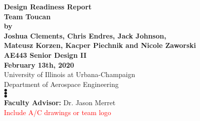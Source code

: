 \documentclass[conf]{new-aiaa}
\begin{document}
\begin{titlepage}
    \begin{center}
        \vspace*{1cm}
        {\LARGE \textbf{Design Readiness Report} \\
        \vspace{0.5cm}
        \textbf{Team Toucan}} \\
        \vspace{0.5cm}
        {\normalsize
        \textbf{by} \\
        \vspace{0.5cm}
        \textbf{Joshua Clements, Chris Endres, Jack Johnson,\\ Mateusz Korzen, Kacper Piechnik and Nicole Zaworski} \\
        \vspace{0.5cm}
        {\large\textbf{AE443 Senior Design II}}\\
        \vspace{0.5cm}
        \textbf{February 13th, 2020}} \\
        \vspace{2.5cm}
        {\large University of Illinois at Urbana-Champaign \\ Department of Aerospace Engineering} \\ 
        {\Large
        $\bullet$\\
        \vspace{2.5cm}
        $\bullet$\\
        \vspace{2.5cm}
        $\bullet$\\
        \vspace{1.75cm}}
        {\normalsize
        \textbf{Faculty Advisor:} Dr. Jason Merret}\\
        \textcolor{red}{Include A/C drawings or team logo}
    \end{center}
\end{titlepage}

\newpage

\end{document}
